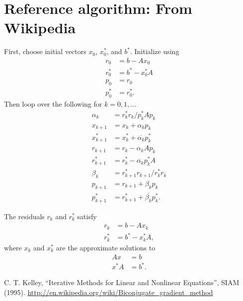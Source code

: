 \documentclass{article}
\begin{document}
\section{Reference algorithm: From Wikipedia}
First, choose initial vectors $x_0$, $x_0^\ast$, and $b^\ast$.
Initialize using
    \begin{subequations}\begin{align}
    r_0 &= b - Ax_0 \\
    r_0^\ast &= b^\ast - x_0^\ast A \\
    p_0 &= r_0 \\
    p_0^\ast &= r_0^\ast.
    \end{align}\end{subequations}
Then loop over the following for $k = 0, 1, \ldots$
    \begin{subequations}\begin{align}
    \alpha_k &= r_k^\ast r_k / p_k^\ast A p_k \\
    x_{k+1} &= x_k + \alpha_k p_k \\
    x_{k+1}^\ast &= x_k^\ast + \overline{\alpha_k} p_k^\ast \\
    r_{k+1} &= r_k - \alpha_k A p_k \\
    r_{k+1}^\ast &= r_k^\ast - \overline{\alpha_k} p_k^\ast A \\
    \beta_k &= r_{k+1}^\ast r_{k+1} / r_k^\ast r_k \\
    p_{k+1} &= r_{k+1} + \beta_k p_k \\
    p_{k+1}^\ast &= r_{k+1}^\ast + \overline{\beta_k} p_k^\ast.
    \end{align}\end{subequations}

The residuals $r_k$ and $r_k^\ast$ satisfy
    \begin{subequations}\begin{align}
    r_k &= b - A x_k \\
    r_k^\ast &= b^\ast - x_k^\ast A,
    \end{align}\end{subequations}
    where $x_k$ and $x_k^\ast$ are the approximate solutions to
    \begin{subequations}\begin{align}
    Ax &= b \\
    x^\ast A &= b^\ast.
    \end{align}\end{subequations}



\begin{thebibliography}{99}
 C. T. Kelley, 
    ``Iterative Methods for Linear and Nonlinear Equations'', 
    SIAM (1995).
 \url{http://en.wikipedia.org/wiki/Biconjugate_gradient_method}
\end{thebibliography}
\end{document}
